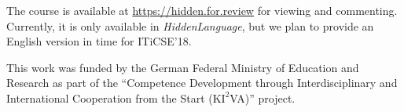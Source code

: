 \documentclass[sigconf,anonymous]{acmart}
\begin{document}
The course is available at \url{https://hidden.for.review} for viewing and commenting. Currently, it is
only available in \emph{HiddenLanguage}, but we plan to provide an English version in time for ITiCSE'18.


\begin{acks}
This work was funded by the German Federal Ministry of Education and Research as part of the 
``Competence Development through Interdisciplinary and International Cooperation from the Start
(K$\mathrm{I^2}$VA)'' project.
\end{acks}


%
\end{document}
